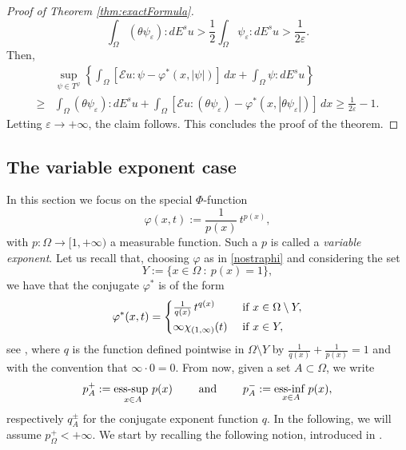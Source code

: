 \documentclass[a4paper,11pt,oneside,notitlepage]{article}
\numberwithin{equation}{section}
\newcommand{\e}{\varepsilon}
\newcommand{\vphi}{\varphi}
\newcommand{\E}{\mathcal{E}}
\newcommand{\st}{ \ : \ }
\begin{document}
\begin{proof}[Proof of Theorem \ref{thm:exactFormula}]
    \begin{equation*}
        \int_\Omega (\theta \psi_\e) : dE^su > \frac{1}{2} \int_\Omega \psi_\e : dE^su > \frac{1}{2\e}. 
    \end{equation*}
    Then,
    \begin{equation*}
    \begin{aligned}
        &\sup_{\psi \in T^\vphi} \left\{\int_\Omega [\E u : \psi - \vphi^*(x, |\psi|)] \, dx + \int_\Omega \psi : dE^su \right\} \\
        \ge & \int_\Omega (\theta \psi_\e) : dE^su + \int_\Omega [\E u : (\theta \psi_\e) - \vphi^*(x, |\theta \psi_\e|)] \, dx \ge \frac{1}{2\e} - 1.
    \end{aligned}
    \end{equation*}
    Letting $\e \to +\infty$, the claim follows. This concludes the proof of the theorem.
\end{proof}


\subsection{The variable exponent case}
\label{sec:BD_px}

In this section we focus on the special $\Phi$-function
\begin{equation}
\label{nostraphi}
    \vphi(x,t) := \frac{1}{p(x)} \, t^{p(x)},
\end{equation}
with $p:\Omega \to [1,+\infty)$ a measurable function. Such  a $p$ is called a {\it variable exponent}. Let us recall that, choosing $\vphi$ as in \eqref{nostraphi} and considering the set
\begin{equation}
\label{set_superlin}
    Y := \{x \in \Omega \st p(x) = 1\},
\end{equation}
we have that the conjugate $\vphi^*$ is of the form
\begin{equation}
\label{phi*def}
    \varphi^*(x,t) =
    \begin{dcases}
        \tfrac{1}{q(x)} \, t^{q(x)} & \textnormal{ if } x \in \Omega \setminus Y, \\
        \infty \chi_{(1, \infty)}(t) & \textnormal{ if } x \in Y,
    \end{dcases}
\end{equation}
see \cite[Example 4.3]{EHH}, where $q$ is the function defined pointwise in $\Omega \setminus Y$ by $\tfrac{1}{q(x)} + \tfrac{1}{p(x)} = 1$ and with the convention that $\infty \cdot 0 = 0$. From now, given a set $A \subset \Omega$, we write
\begin{equation*}
    p^+_A := \underset{x \in A}{\textnormal{ess-sup} \ } p(x) \qquad \textnormal{ and } \qquad p^-_A := \underset{x \in A}{\textnormal{ess-inf} \ } p(x),
\end{equation*}
respectively $q^\pm_A$ for the conjugate exponent function $q$. In the following, we will assume $p^+_\Omega < +\infty$. We start by recalling the following notion, introduced in \cite{BHHZ}.
\end{document}
